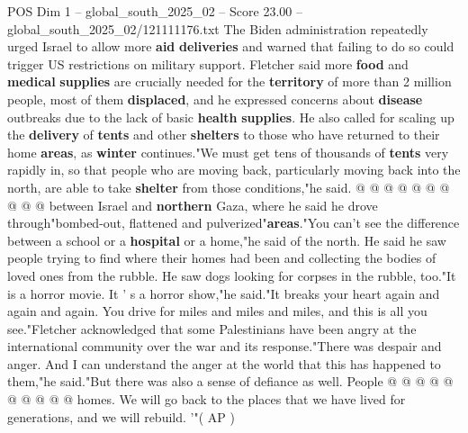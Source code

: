 \begin{textsample}{POS Dim 1 – global\_south\_2025\_02 – Score 23.00 – global\_south\_2025\_02/121111176.txt}
The Biden administration repeatedly urged Israel to allow more \textbf{aid} \textbf{deliveries} and warned that failing to do so could trigger US restrictions on military support.
Fletcher said more \textbf{food} and \textbf{medical} \textbf{supplies} are crucially needed for the \textbf{territory} of more than 2 million people, most of them \textbf{displaced}, and he expressed concerns about \textbf{disease} outbreaks due to the lack of basic \textbf{health} \textbf{supplies}.
He also called for scaling up the \textbf{delivery} of \textbf{tents} and other \textbf{shelters} to those who have returned to their home \textbf{areas}, as \textbf{winter} continues."We must get tens of thousands of \textbf{tents} very rapidly in, so that people who are moving back, particularly moving back into the north, are able to take \textbf{shelter} from those conditions,"he said. @ @ @ @ @ @ @ @ @ @ between Israel and \textbf{northern} Gaza, where he said he drove through"bombed-out, flattened and pulverized"\textbf{areas}."You can't see the difference between a school or a \textbf{hospital} or a home,"he said of the north.
He said he saw people trying to find where their homes had been and collecting the bodies of loved ones from the rubble.
He saw dogs looking for corpses in the rubble, too."It is a horror movie.
It ' s a horror show,"he said."It breaks your heart again and again and again.
You drive for miles and miles and miles, and this is all you see."Fletcher acknowledged that some Palestinians have been angry at the international community over the war and its response."There was despair and anger.
And I can understand the anger at the world that this has happened to them,"he said."But there was also a sense of defiance as well.
People @ @ @ @ @ @ @ @ @ @ homes.
We will go back to the places that we have lived for generations, and we will rebuild. '"( AP )

\end{textsample}
